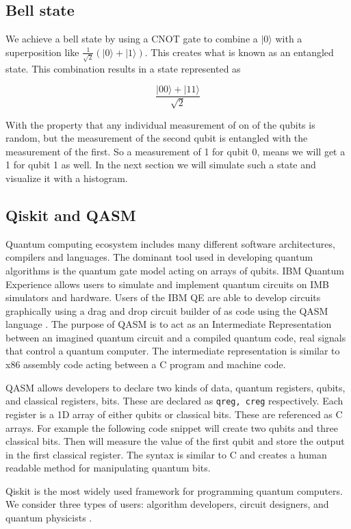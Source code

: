 \documentclass[conference]{IEEEtran}
\newcommand{\ket}[1]{{\lvert #1 \rangle}}
\begin{document}
\subsection{Bell state}

We achieve a bell state by using a CNOT gate to combine a $\ket{0}$ with a superposition like 
$\frac{1}{\sqrt{2}}(\ket{0}+\ket{1})$. This creates what is known as an entangled state. This combination results in a state represented as 

$$
\frac{\ket{00}+\ket{11}}{\sqrt{2}}
$$

With the property that any individual measurement of on of the qubits is random, but the measurement of the second qubit is entangled with the measurement of the first. So a measurement of 1 for qubit 0, means we will get a 1 for qubit 1 as well. In the next section we will simulate such a state and visualize it with a histogram.

\subsection{Qiskit and QASM}
Quantum computing ecosystem includes many different software architectures, compilers and languages. The dominant tool used in developing quantum algorithms is the quantum gate model acting on arrays of qubits. IBM Quantum Experience allows users to simulate and implement quantum circuits on IMB simulators and hardware. Users of the IBM QE are able to develop circuits graphically using a drag and drop circuit builder of as code using the QASM language \cite{b5}. The purpose of QASM is to act as an Intermediate Representation between an imagined quantum circuit and a compiled quantum code, real signals that control a quantum computer. The intermediate representation is similar to x86 assembly code acting between a C program and machine code.

QASM allows developers to declare two kinds of data, quantum registers, qubits, and classical registers, bits. These are declared as \texttt{qreg, creg} respectively. Each register is a 1D array of either qubits or classical bits. These are referenced as C arrays. For example the following code snippet will create two qubits and three classical bits. Then will measure the value of the first qubit and store the output in the first classical register. The syntax is similar to C and creates a human readable method for manipulating quantum bits.

Qiskit is the most widely used framework for programming quantum computers. We consider three types of users: algorithm developers, circuit designers, and quantum physicists \cite{b6}. 
\end{document}
